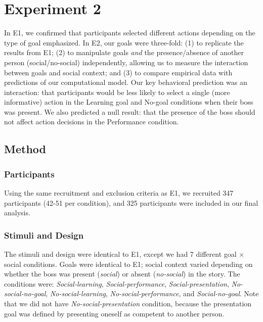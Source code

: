 \documentclass[10pt, letterpaper]{article}
\begin{document}
\section{Experiment 2}\label{experiment-2}

In E1, we confirmed that participants selected different actions
depending on the type of goal emphasized. In E2, our goals were
three-fold: (1) to replicate the results from E1; (2) to manipulate
goals \emph{and} the presence/absence of another person
(social/no-social) independently, allowing us to measure the interaction
between goals and social context; and (3) to compare empirical data with
predictions of our computational model. Our key behavioral prediction
was an interaction: that participants would be less likely to select a
single (more informative) action in the Learning goal and No-goal
conditions when their boss was present. We also predicted a null result:
that the presence of the boss should not affect action decisions in the
Performance condition.

\subsection{Method}\label{method-1}

\subsubsection{Participants}\label{participants-1}

Using the same recruitment and exclusion criteria as E1, we recruited
347 participants (42-51 per condition), and 325 participants were
included in our final analysis.

\subsubsection{Stimuli and Design}\label{stimuli-and-design-1}

The stimuli and design were identical to E1, except we had 7 different
goal \(\times\) social conditions. Goals were identical to E1; social
context varied depending on whether the boss was present (\emph{social})
or absent (\emph{no-social}) in the story. The conditions were:
\emph{Social-learning}, \emph{Social-performance},
\emph{Social-presentation}, \emph{No-social-no-goal},
\emph{No-social-learning}, \emph{No-social-performance}, and
\emph{Social-no-goal}. Note that we did not have
\emph{No-social-presentation} condition, because the presentation goal
was defined by presenting oneself as competent to another person.
\end{document}
